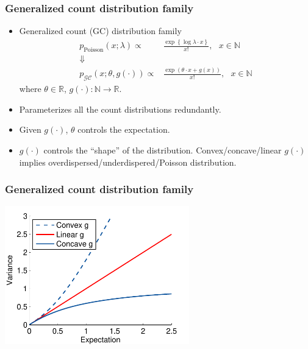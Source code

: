\documentclass[16pt,presentation]{beamer}
\begin{document}
\begin{frame}
\frametitle{Generalized count distribution family}
\begin{itemize}
\item Generalized count (GC) distribution family
\[\begin{split}
p_{\text{Poisson}}(x; \lambda) \propto& \frac{\exp\left\{\log{\lambda} \cdot x\right\}}{x!},~~~x \in \mathbb{N}\\
\Downarrow&\\
p_{\mathcal{GC}}(x; \theta, g(\cdot)) \propto& \frac{\exp(\theta \cdot x + g(x) )}{x!}, ~~~x \in \mathbb{N}
\end{split}\]
where $\theta \in \mathbb{R}$, $g(\cdot): \mathbb{N} \rightarrow \mathbb{R}$.
\item Parameterizes \alert{all} the count distributions \alert{redundantly}.
\item Given $g(\cdot)$, $\theta$ controls the expectation.
\item $g(\cdot)$ controls the ``shape'' of the distribution. Convex/concave/linear $g(\cdot)$ implies overdispersed/underdispered/Poisson distribution.
\end{itemize}
\end{frame}


\begin{frame}
\frametitle{Generalized count distribution family}
\begin{center}
\includegraphics[width = 0.60\textwidth]{./figs/gclds/fig_var_GPoiss.pdf}
\end{center}
\end{frame}
\end{document}
